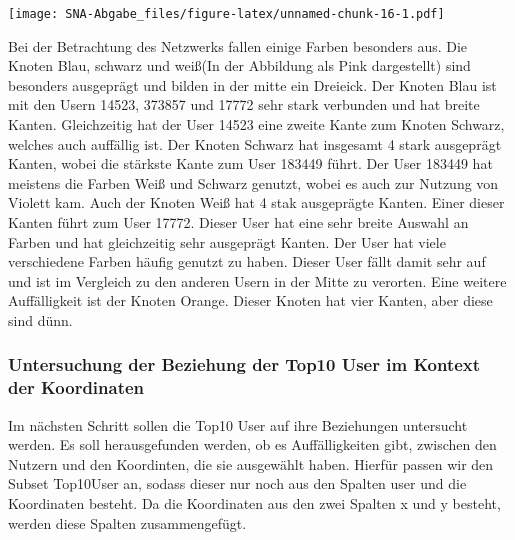 \documentclass[
]{article}
\begin{document}
\texttt{[image: SNA-Abgabe\_files/figure-latex/unnamed-chunk-16-1.pdf]}

Bei der Betrachtung des Netzwerks fallen einige Farben besonders aus.
Die Knoten Blau, schwarz und weiß(In der Abbildung als Pink dargestellt)
sind besonders ausgeprägt und bilden in der mitte ein Dreieick. Der
Knoten Blau ist mit den Usern 14523, 373857 und 17772 sehr stark
verbunden und hat breite Kanten. Gleichzeitig hat der User 14523 eine
zweite Kante zum Knoten Schwarz, welches auch auffällig ist. Der Knoten
Schwarz hat insgesamt 4 stark ausgeprägt Kanten, wobei die stärkste
Kante zum User 183449 führt. Der User 183449 hat meistens die Farben
Weiß und Schwarz genutzt, wobei es auch zur Nutzung von Violett kam.
Auch der Knoten Weiß hat 4 stak ausgeprägte Kanten. Einer dieser Kanten
führt zum User 17772. Dieser User hat eine sehr breite Auswahl an Farben
und hat gleichzeitig sehr ausgeprägt Kanten. Der User hat viele
verschiedene Farben häufig genutzt zu haben. Dieser User fällt damit
sehr auf und ist im Vergleich zu den anderen Usern in der Mitte zu
verorten. Eine weitere Auffälligkeit ist der Knoten Orange. Dieser
Knoten hat vier Kanten, aber diese sind dünn.

\subsubsection{Untersuchung der Beziehung der Top10 User im Kontext der
Koordinaten}\label{untersuchung-der-beziehung-der-top10-user-im-kontext-der-koordinaten}

Im nächsten Schritt sollen die Top10 User auf ihre Beziehungen
untersucht werden. Es soll herausgefunden werden, ob es Auffälligkeiten
gibt, zwischen den Nutzern und den Koordinten, die sie ausgewählt haben.
Hierfür passen wir den Subset Top10User an, sodass dieser nur noch aus
den Spalten user und die Koordinaten besteht. Da die Koordinaten aus den
zwei Spalten x und y besteht, werden diese Spalten zusammengefügt.
\end{document}
